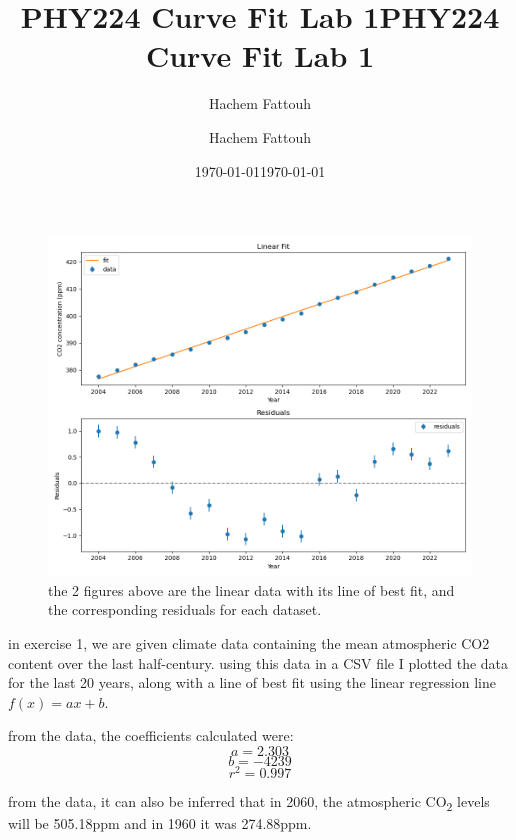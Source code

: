 \documentclass{article}
\title{PHY224 Curve Fit Lab 1}
\author{Hachem Fattouh}
\date{\today}
\title{PHY224 Curve Fit Lab 1}
\author{Hachem Fattouh}
\date{\today}
\begin{document}
\maketitle

\begin{figure}[h]
  \centering
  \includegraphics[width=\textwidth]{Exercise 1.png} 
  \caption{the 2 figures above are the linear data with its line of best fit,
  and the corresponding residuals for each dataset.}
  \label{fig:fit_and_residuals}
\end{figure}

in exercise 1, we are given climate data containing the mean atmospheric CO2 content over the last half-century. using this data in a CSV file I plotted the data
for the last 20 years, along with a line of best fit using the linear regression line \(f(x) = ax + b\).


from the data, the coefficients calculated were:
\[a = 2.303\]
\[b = -4239\]
\[r^2 = 0.997\]

from the data, it can also be inferred that in 2060, the atmospheric
CO\textsubscript{2} levels will be 505.18ppm and in 1960 it was
274.88ppm.

\pagebreak
\end{document}
